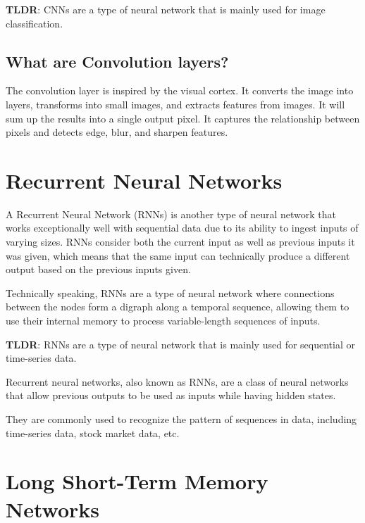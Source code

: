 \documentclass[
]{book}
\begin{document}
\textbf{TLDR}: CNNs are a type of neural network that is mainly used for image classification.

\hypertarget{what-are-convolution-layers}{%
\subsection{What are Convolution layers?}\label{what-are-convolution-layers}}

The convolution layer is inspired by the visual cortex. It converts the image into layers, transforms into small images, and extracts features from images. It will sum up the results into a single output pixel. It captures the relationship between pixels and detects edge, blur, and sharpen features.

\hypertarget{recurrent-neural-networks}{%
\section{Recurrent Neural Networks}\label{recurrent-neural-networks}}

A Recurrent Neural Network (RNNs) is another type of neural network that works exceptionally well with sequential data due to its ability to ingest inputs of varying sizes. RNNs consider both the current input as well as previous inputs it was given, which means that the same input can technically produce a different output based on the previous inputs given.

Technically speaking, RNNs are a type of neural network where connections between the nodes form a digraph along a temporal sequence, allowing them to use their internal memory to process variable-length sequences of inputs.

\textbf{TLDR}: RNNs are a type of neural network that is mainly used for sequential or time-series data.

Recurrent neural networks, also known as RNNs, are a class of neural networks that allow previous outputs to be used as inputs while having hidden states.

They are commonly used to recognize the pattern of sequences in data, including time-series data, stock market data, etc.

\hypertarget{long-short-term-memory-networks}{%
\section{Long Short-Term Memory Networks}\label{long-short-term-memory-networks}}
\end{document}
